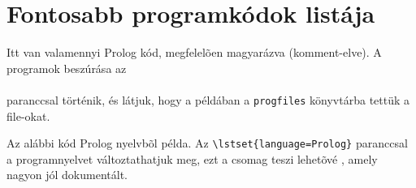 \chapter{Fontosabb programkódok listája}\label{ch:progik}

\lstset{language=Prolog}

Itt van valamennyi Prolog kód, megfelelõen magyarázva (komment-elve). A programok beszúrása az\\
\verb++\\
paranccsal történik, és látjuk, hogy a példában a \verb+progfiles+ könyvtárba tettük a file-okat.

Az alábbi kód Prolog nyelvbõl példa. Az \verb+\lstset{language=Prolog}+ paranccsal a programnyelvet változtathatjuk meg, ezt a  csomag teszi lehetõvé \cite{listingCite}, amely nagyon jól dokumentált.



